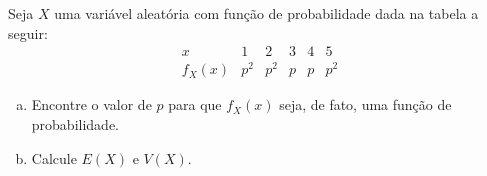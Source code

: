 %
%


\begin{exercicioBanco}[\valorquestao]
    Seja \(X\) uma variável aleatória com função de probabilidade dada na tabela a seguir:
    \[
        \begin{array}{c|c|c|c|c|c}
            x & 1 & 2 & 3 & 4 & 5 \\
            \hline
            f_{X}(x) & p^{2} & p^{2} & p & p & p^{2}
        \end{array}
    \]
    \begin{enumerate}[(a)]
        \item Encontre o valor de \(p\) para que \(f_{X}(x)\) seja, de fato, uma função de probabilidade.
        \item Calcule \(E(X)\) e \(V(X)\).
    \end{enumerate}
\end{exercicioBanco}


